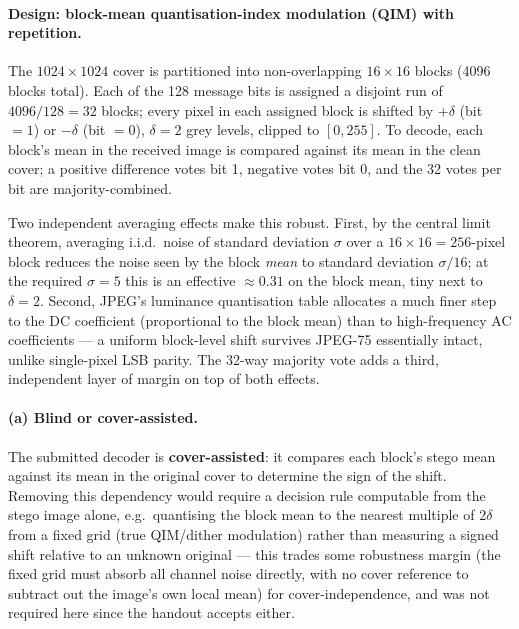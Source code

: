 \documentclass[11pt]{article}
\begin{document}
\paragraph{Design: block-mean quantisation-index modulation (QIM) with repetition.}
The $1024\times1024$ cover is partitioned into non-overlapping $16\times16$ blocks (4096 blocks
total). Each of the 128 message bits is assigned a disjoint run of $4096/128=32$ blocks; every
pixel in each assigned block is shifted by $+\delta$ (bit $=1$) or $-\delta$ (bit $=0$),
$\delta=2$ grey levels, clipped to $[0,255]$. To decode, each block's mean in the received image
is compared against its mean in the clean cover; a positive difference votes bit 1, negative
votes bit 0, and the 32 votes per bit are majority-combined.

Two independent averaging effects make this robust. First, by the central limit theorem,
averaging i.i.d.\ noise of standard deviation $\sigma$ over a $16\times16=256$-pixel block
reduces the noise seen by the block \emph{mean} to standard deviation $\sigma/16$; at the
required $\sigma=5$ this is an effective $\approx0.31$ on the block mean, tiny next to
$\delta=2$. Second, JPEG's luminance quantisation table allocates a much finer step to the DC coefficient
(proportional to the block mean) than to high-frequency AC coefficients --- a uniform
block-level shift survives JPEG-75 essentially intact, unlike single-pixel LSB parity. The 32-way majority vote adds a third, independent layer of margin on top of both
effects.

\paragraph{(a) Blind or cover-assisted.}
The submitted decoder is \textbf{cover-assisted}: it compares each block's stego mean against
its mean in the original cover to determine the sign of the shift. Removing this dependency
would require a decision rule computable from the stego image alone, e.g.\ quantising the block
mean to the nearest multiple of $2\delta$ from a fixed grid (true QIM/dither modulation) rather
than measuring a signed shift relative to an unknown original --- this trades some robustness
margin (the fixed grid must absorb all channel noise directly, with no cover reference to
subtract out the image's own local mean) for cover-independence, and was not required here since
the handout accepts either.
\end{document}
